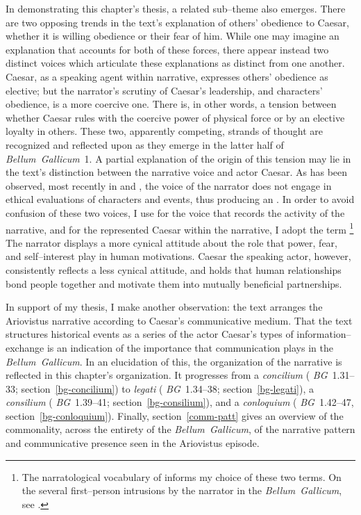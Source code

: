 \documentclass[12pt,letterpaper,oneside,final]{memoir}
\begin{document}
In demonstrating this chapter's thesis, a related sub--theme also emerges. There are two opposing trends in the text's explanation of others' obedience to Caesar, whether it is willing obedience or their fear of him. While one may imagine an explanation that accounts for both of these forces, there appear instead two distinct voices which articulate these explanations as distinct from one another. Caesar, as a speaking agent within narrative, expresses others' obedience as elective; but the narrator's scrutiny of Caesar's leadership, and characters' obedience, is a more coercive one. There is, in other words, a tension between whether Caesar rules with the coercive power of physical force or by an elective loyalty in others. These two, apparently competing, strands of thought are recognized and reflected upon as they emerge in the latter half of \emph{Bellum~Gallicum}~1. A partial explanation of the origin of this tension may lie in the text's distinction between the narrative voice and actor Caesar. As has been observed, most recently in \textcite[150--155]{riggsby2006} and \textcite[148--156]{batstonedamon2006}, the voice of the narrator does not engage in ethical evaluations of characters and events, thus producing an . In order to avoid confusion of these two voices, I use  for the voice that records the activity of the narrative, and for the represented Caesar within the narrative, I adopt the term \footnote{The narratological vocabulary of \textcite{bal1997} informs my choice of these two terms. On the several first--person intrusions by the narrator in the \emph{Bellum~Gallicum}, see \textcite[pp.~150--151 and 242--243, nn.~90--94]{riggsby2006}.} The narrator displays a more cynical attitude about the role that power, fear, and self--interest play in human motivations. Caesar the speaking actor, however, consistently reflects a less cynical attitude, and holds that human relationships bond people together and motivate them into mutually beneficial partnerships.

In support of my thesis, I make another observation: the text arranges the Ariovistus narrative according to Caesar's communicative medium. That the text structures historical events as a series of the actor Caesar's types of information--exchange is an indication of the importance that communication plays in the \emph{Bellum~Gallicum}. In an elucidation of this, the organization of the narrative is reflected in this chapter's organization. It progresses from a \emph{concilium} ( \emph{BG}~1.31--33; section~\ref{bg-concilium}) to \emph{legati} ( \emph{BG}~1.34--38; section~\ref{bg-legati}), a \emph{consilium} ( \emph{BG}~1.39--41; section~\ref{bg-consilium}), and a \emph{conloquium} ( \emph{BG}~1.42--47, section~\ref{bg-conloquium}). Finally, section~\ref{comm-patt} gives an overview of the commonality, across the entirety of the \emph{Bellum~Gallicum}, of the narrative pattern and communicative presence seen in the Ariovistus episode.
\end{document}
